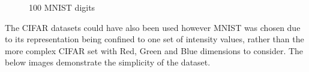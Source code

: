 \documentclass[a4paper,11pt,titlepage]{article}
\begin{document}
	\begin{figure}[H]
    			\caption{100 MNIST digits}%
	\end{figure}
	

	\par 
	The CIFAR datasets could have also been used however MNIST was chosen due to its representation being confined to one set of intensity values, rather than the more complex CIFAR set with Red, Green and Blue dimensions to consider. The below images demonstrate the simplicity of the dataset.

	\begin{figure}[H]
    			\centering	
    			\qquad
    			\caption{}%
    			\label{fig:mnist_four}
		\end{figure}
\end{document}
